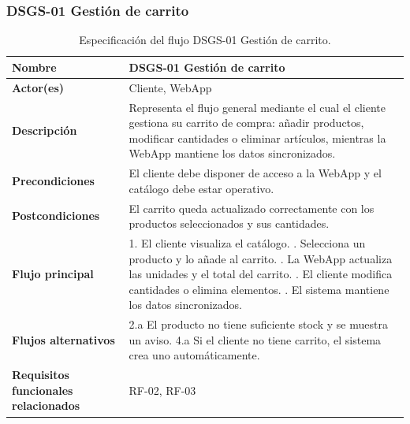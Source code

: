 \subsubsection{DSGS-01 Gestión de carrito}

\begin{table}[H]
\centering
\small
\begin{tabular}{|p{}|p{}|}
\hline
\textbf{Nombre} & DSGS-01 Gestión de carrito \\ \hline

\textbf{Actor(es)} & Cliente, WebApp \\ \hline

\textbf{Descripción} & 
Representa el flujo general mediante el cual el cliente gestiona su carrito de compra: 
añadir productos, modificar cantidades o eliminar artículos, mientras la WebApp mantiene 
los datos sincronizados. \\ \hline

\textbf{Precondiciones} & 
El cliente debe disponer de acceso a la WebApp y el catálogo debe estar operativo. \\ \hline

\textbf{Postcondiciones} & 
El carrito queda actualizado correctamente con los productos seleccionados y sus cantidades. \\ \hline

\textbf{Flujo principal} & 
1. El cliente visualiza el catálogo. \newline
2. Selecciona un producto y lo añade al carrito. \newline
3. La WebApp actualiza las unidades y el total del carrito. \newline
4. El cliente modifica cantidades o elimina elementos. \newline
5. El sistema mantiene los datos sincronizados. \\ \hline

\textbf{Flujos alternativos} &
2.a El producto no tiene suficiente stock y se muestra un aviso. \newline
4.a Si el cliente no tiene carrito, el sistema crea uno automáticamente. \\ \hline

\textbf{Requisitos funcionales relacionados} & RF-02, RF-03 \\ \hline
\end{tabular}
\caption{Especificación del flujo DSGS-01 Gestión de carrito.}
\end{table}


